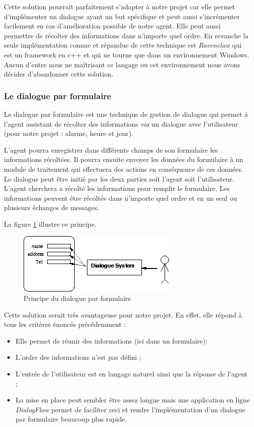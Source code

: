 \FloatBarrier

Cette solution pourrait parfaitement s'adapter à notre projet car elle permet d'implémenter un dialogue ayant un but spécifique et peut aussi s'incrémenter facilement en cas d'amélioration possible de notre agent. Elle peut aussi permettre de récolter des informations dans n'importe quel ordre. En revanche la seule implémentation connue et répandue de cette technique est \textit{Ravenclaw} qui est un framework en c++ et qui ne tourne que dans un environnement Windows. Aucun d'entre nous ne maîtrisant ce langage ou cet environnement nous avons décider d'abandonner cette solution. 

\subsubsection{Le dialogue par formulaire}
Le dialogue par formulaire est une technique de gestion de dialogue qui permet à l'agent assistant de récolter des informations \emph{via} un dialogue avec l'utilisateur (pour notre projet : alarme, heure et jour). 

L'agent pourra enregistrer dans différents champs de son formulaire les informations récoltées. Il pourra ensuite envoyer les données du formulaire à un module de traitement qui effectuera des actions en conséquence de ces données. Le dialogue peut être initié par les deux parties soit l'agent soit l'utilisateur. L'agent cherchera a récolté les informations pour remplir le formulaire. Les informations peuvent être récoltés dans n'importe quel ordre et en un seul ou plusieurs échanges de messages.

La figure \ref{form-dialog} illustre ce principe.
\begin{figure}[H]
\centering
    \includegraphics[scale=0.7]{images/slot.png} %
    \caption{Principe du dialogue par formulaire}
    \label{form-dialog}
\end{figure}

Cette solution serait très avantageuse pour notre projet. 
En effet, elle répond à tous les critères énoncés précédemment : 
\begin{itemize}
    \item Elle permet de réunir des informations (ici dans un formulaire);
    \item L'ordre des informations n'est pas défini ;
    \item L'entrée de l'utilisateur est en langage naturel ainsi que la réponse de l'agent ;
    \item La mise en place peut sembler être assez longue mais une application en ligne \textit{DialogFlow} permet de faciliter ceci et rendre l'implémentation d'un dialogue par formulaire beaucoup plus rapide.
\end{itemize}
\FloatBarrier



